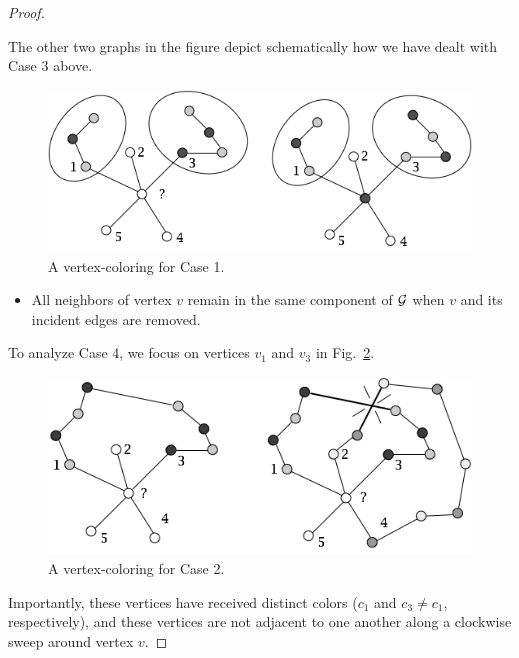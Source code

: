 \begin{proof}
\begin{description}
The other two graphs in the figure depict schematically how we have dealt with Case 3 above.
\begin{figure}[hbt]
\begin{center}
   \includegraphics[scale=0.4]{FiguresGraph/5colorsCase1}
\caption{A vertex-coloring for Case 1.}
  \label{fig:5colorsCase1}
\end{center}
\end{figure}
\begin{itemize}
\item
All neighbors of vertex $v$ remain in the same component of $\mbox{$\cal G$}$ when $v$ and its incident edges are removed.
\end{itemize}
\end{description}
To analyze Case 4, we focus on vertices $v_1$ and $v_3$ in Fig.~\ref{fig:5colorsCase2}.
\begin{figure}[hbt]
\begin{center}
   \includegraphics[scale=0.4]{FiguresGraph/5colorsCase2}
\caption{A vertex-coloring for Case 2.}
  \label{fig:5colorsCase2}
\end{center}
\end{figure}
Importantly, these vertices have received distinct colors ($c_1$ and $c_3 \neq c_1$, respectively), and these vertices are not adjacent to one another along a clockwise sweep around vertex $v$.

\smallskip


\end{proof}
